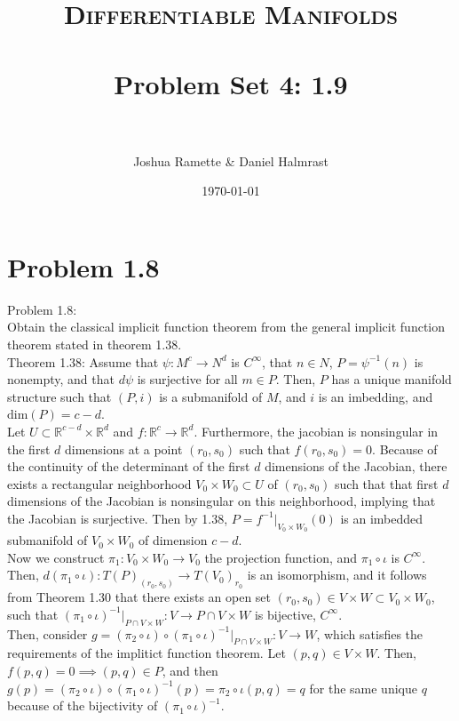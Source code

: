\documentclass[paper=a4, fontsize=11pt]{scrartcl} %
\title{    
\normalfont \normalsize 
\textsc{Differentiable Manifolds} \\ [25pt] %
\horrule{0.5pt} \\[0.4cm] %
\huge Problem Set 4: 1.9 \\ %
\horrule{2pt} \\[0.5cm] %
}
\author{Joshua Ramette \& Daniel Halmrast} %
\date{\normalsize\today} %
\numberwithin{equation}{section} %
\numberwithin{figure}{section} %
\numberwithin{table}{section} %
\begin{document}
\maketitle %


\section*{Problem 1.8}

Problem 1.8:\\
Obtain the classical implicit function theorem from the general implicit function theorem stated in theorem 1.38.\\


Theorem 1.38: Assume that $\psi:M^c \to N^d$ is $C^{\infty}$, that $n \in N$, $P=\psi^{-1}(n)$ is nonempty, and that $d\psi$ is surjective for all $m \in P$. 
Then, $P$ has a unique manifold structure such that $(P,i)$ is a submanifold of $M$, and $i$ is an imbedding, and $\mathrm{dim}(P)=c-d$. \\

Let $U \subset \mathbb{R}^{c-d} \times \mathbb{R}^d$ and $f: \mathbb{R}^c \to \mathbb{R}^d$. Furthermore, the jacobian is nonsingular in the first $d$ dimensions at a point $(r_0, s_0)$ such that $f(r_0, s_0) = 0$. Because of the continuity of the determinant of the first $d$ dimensions of the Jacobian, there exists a rectangular neighborhood $V_0 \times W_0 \subset U$ of $(r_0, s_0)$ such that that first $d$ dimensions of the Jacobian is nonsingular on this neighborhood, implying that the Jacobian is surjective. Then by 1.38, $P = f^{-1} |_{V_0 \times W_0}(0)$ is an imbedded submanifold of $V_0 \times W_0$ of dimension $c-d$. \\

Now we construct $\pi_1: V_0 \times W_0 \to V_0$ the projection function, and $\pi_1 \circ \iota$ is $C^{\infty}$.  Then, $d(\pi_1 \circ \iota): T(P)_{(r_0,s_0)} \to T(V_0)_{r_0}$ is an isomorphism, and it follows from Theorem 1.30  that there exists an open set $(r_0,s_0) \in V \times W \subset V_0 \times W_0$, such that $(\pi_1 \circ \iota) ^{-1}|_{P \cap V \times W}: V \to P \cap V \times W$ is bijective, $C^{\infty}$. \\

Then, consider $g = (\pi_2 \circ \iota) \circ (\pi_1 \circ \iota)^{-1} |_{P \cap V \times W}: V \to W$, which satisfies the requirements of the implitict function theorem. Let $(p,q) \in V \times W$. Then, $f(p,q) = 0 \implies (p,q) \in P$, and then $g(p) = (\pi_2 \circ \iota) \circ (\pi_1 \circ \iota)^{-1} (p) = \pi_2 \circ \iota (p,q) = q $ for the same unique $q$ because of the bijectivity of $(\pi_1 \circ \iota)^{-1}$. \\
\end{document}
